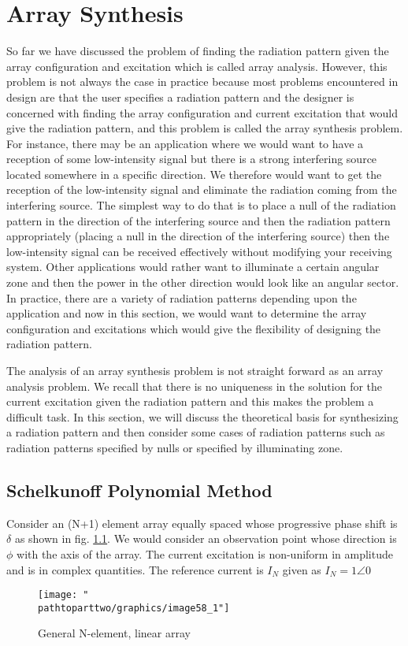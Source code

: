 \chapter{Array Synthesis}
So far we have discussed the problem of finding the radiation pattern given the array configuration and excitation which is called array analysis. However, this problem is not always the case in practice because most problems encountered in design are that the user specifies a radiation pattern and the designer is concerned with finding the array configuration and current excitation that would give the radiation pattern, and this problem is called the array synthesis problem. For instance, there may be an application where we would want to have a reception of some low-intensity signal but there is a strong interfering source located somewhere in a specific direction. We therefore would want to get the reception of the low-intensity signal and eliminate the radiation coming from the interfering source. The simplest way to do that is to place a null of the radiation pattern in the direction of the interfering source and then the radiation pattern appropriately (placing a null in the direction of the interfering source) then the low-intensity signal can be received effectively without modifying your receiving system. Other applications would rather want to illuminate a certain angular zone and then the power in the other direction would look like an angular sector. In practice, there are a variety of radiation patterns depending upon the application and now in this section, we would want to determine the array configuration and excitations which would give the flexibility of designing the radiation pattern.

The analysis of an array synthesis problem is not straight forward as an array analysis problem. We recall that there is no uniqueness in the solution for the current excitation given the radiation pattern and this makes the problem a difficult task. In this section, we will discuss the theoretical basis for synthesizing a radiation pattern and then consider some cases of radiation patterns such as radiation patterns specified by nulls or specified by illuminating zone.

\section{Schelkunoff Polynomial Method}
Consider an (N+1) element array equally spaced whose progressive phase shift is $\delta$ as shown in fig. \ref{fig:fig 55_1}. We would consider an observation point whose direction is $\phi$ with the axis of the array. The current excitation is non-uniform in amplitude and is in complex quantities. The reference current is $I_{N}$ given as $I_{N}=1\angle 0$
\begin{figure}[h]
\centering
\texttt{[image: "\\pathtoparttwo/graphics/image58\_1"]}
\caption{ General N-element, linear array}
\label{fig:fig 55_1}
\end{figure}

